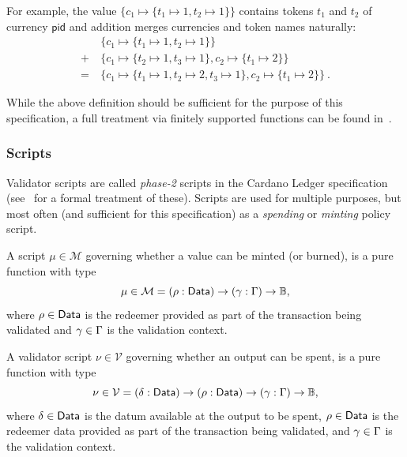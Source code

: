 For example, the value $\{c_{1} \mapsto \{t_1 \mapsto 1, t_2 \mapsto 1\}\}$
contains tokens $t_1$ and $t_2$ of currency $\mathsf{pid}$ and addition merges currencies
and token names naturally:
\begin{align*}
  & \{c_{1} \mapsto \{t_1 \mapsto 1, t_2 \mapsto 1\}\} \\
  + \ & \{c_{1} \mapsto \{t_{2} \mapsto 1, t_3 \mapsto 1\}, c_{2} \mapsto \{ t_{1} \mapsto 2\}\} \\
  = \ & \{c_{1} \mapsto \{t_1 \mapsto 1, t_2 \mapsto 2, t_3 \mapsto 1\}, c_{2} \mapsto \{ t_{1} \mapsto 2\}\} \ .
\end{align*}

While the above definition should be sufficient for the purpose of this
specification, a full treatment via finitely supported functions can be found
in~\cite{utxo-ma}.

\subsubsection{Scripts}

Validator scripts are called \emph{phase-2} scripts in the Cardano Ledger
specification (see~\cite{ledger-alonzo-spec} for a formal treatment of these). Scripts
are used for multiple purposes, but most often (and sufficient for this
specification) as a \emph{spending} or \emph{minting} policy script.

\begin{definition}
  A script $\mu \in \mathcal{M}$ governing whether a value can be minted (or
  burned), is a pure function with type
  \[
    \mu \in \mathcal{M} = (\rho : \mathsf{Data}) \to (\gamma : \Gamma) \to\mathbb{B},
  \]
  where $\rho \in \mathsf{Data}$ is the redeemer provided as part of the transaction
  being validated and $\gamma \in \Gamma$ is the validation
  context.
\end{definition}

\begin{definition}
  A validator script $\nu \in \mathcal{V}$ governing whether an output can be
  spent, is a pure function with type
  \[
    \nu \in \mathcal{V} = (\delta : \mathsf{Data}) \to (\rho : \mathsf{Data}) \to (\gamma : \Gamma) \to\mathbb{B},
  \]
  where $\delta \in \mathsf{Data}$ is the datum available at the output to be spent,
  $\rho \in \mathsf{Data}$ is the redeemer data provided as part of the transaction
  being validated, and $\gamma \in \Gamma$ is the validation
  context.
\end{definition}

